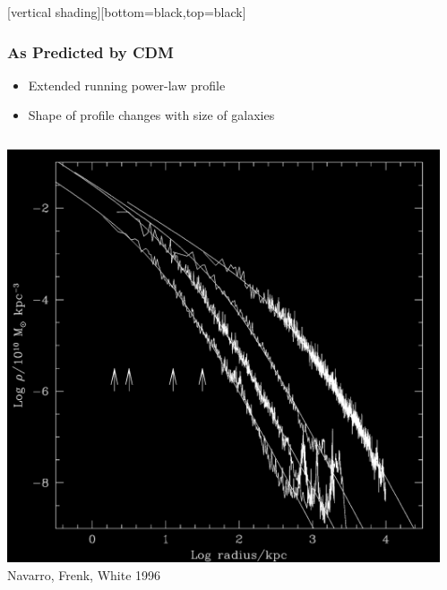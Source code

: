 \documentclass{beamer}
\begin{document}
{
    [vertical shading][bottom=black,top=black]



    \frame
    {
        \frametitle{As Predicted by CDM}

        \begin{itemize}

            \item Extended running power-law profile

            \item Shape of profile changes with size of galaxies

        \end{itemize}


        \begin{columns}
            \begin{column}{0.5\textwidth}    
                \includegraphics[width=\textwidth]{nfw.png}
                \newline
                {\tiny Navarro, Frenk, White 1996}
            \end{column}
            \begin{column}{0.5\textwidth}

\end{column}
\end{columns}}}
\end{document}
